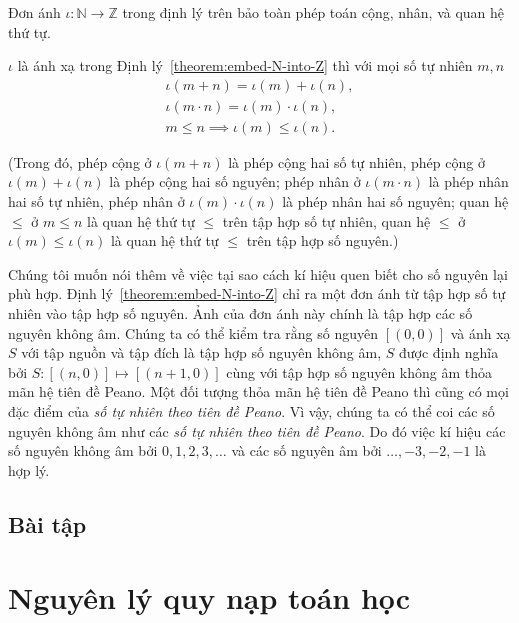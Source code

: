 Đơn ánh $\iota: \mathbb{N}\to \mathbb{Z}$ trong định lý trên bảo toàn phép toán cộng, nhân, và quan hệ thứ tự.

\begin{theorem}\label{theorem:monomorphism-N-to-Z}
	$\iota$ là ánh xạ trong Định lý~\ref{theorem:embed-N-into-Z} thì với mọi số tự nhiên $m, n$
	\[
		\begin{split}
			\iota(m + n) = \iota(m) + \iota(n), \\
			\iota(m\cdot n) = \iota(m)\cdot\iota(n), \\
			m\leq n \implies \iota(m)\leq \iota(n).
		\end{split}
	\]

	(Trong đó, phép cộng ở $\iota(m + n)$ là phép cộng hai số tự nhiên, phép cộng ở $\iota(m) + \iota(n)$ là phép cộng hai số nguyên; phép nhân ở $\iota(m\cdot n)$ là phép nhân hai số tự nhiên, phép nhân ở $\iota(m)\cdot\iota(n)$ là phép nhân hai số nguyên; quan hệ $\leq$ ở $m\leq n$ là quan hệ thứ tự $\leq$ trên tập hợp số tự nhiên, quan hệ $\leq$ ở $\iota(m)\leq \iota(n)$ là quan hệ thứ tự $\leq$ trên tập hợp số nguyên.)
\end{theorem}

Chúng tôi muốn nói thêm về việc tại sao cách kí hiệu quen biết cho số nguyên lại phù hợp. Định lý~\ref{theorem:embed-N-into-Z} chỉ ra một đơn ánh từ tập hợp số tự nhiên vào tập hợp số nguyên. Ảnh của đơn ánh này chính là tập hợp các số nguyên không âm. Chúng ta có thể kiểm tra rằng số nguyên $[(0,0)]$ và ánh xạ $S$ với tập nguồn và tập đích là tập hợp số nguyên không âm, $S$ được định nghĩa bởi $S: [(n,0)] \mapsto [(n+1,0)]$ cùng với tập hợp số nguyên không âm thỏa mãn hệ tiên đề Peano. Một đối tượng thỏa mãn hệ tiên đề Peano thì cũng có mọi đặc điểm của \textit{số tự nhiên theo tiên đề Peano}. Vì vậy, chúng ta có thể coi các số nguyên không âm như các \textit{số tự nhiên theo tiên đề Peano}. Do đó việc kí hiệu các số nguyên không âm bởi $0, 1, 2, 3,\ldots$ và các số nguyên âm bởi $\ldots, -3, -2, -1$ là hợp lý.

\subsection*{Bài tập}

\section{Nguyên lý quy nạp toán học}\label{section:principle-of-mathematical-induction}

